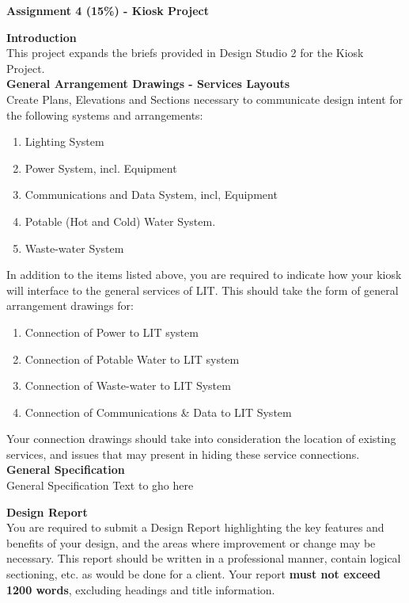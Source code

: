 
	
\begin{flushleft}
\Large\textbf{Assignment 4 (15\%) - Kiosk Project}\\
\end{flushleft}


\textbf{Introduction}\\
This project expands the briefs provided in Design Studio 2 for the Kiosk Project.\\

\textbf{General Arrangement Drawings - Services Layouts }\\
Create Plans, Elevations and Sections necessary to communicate design intent for the following systems and arrangements:

\begin{enumerate}
	\item Lighting System
	\item Power System, incl. Equipment
	\item Communications and Data System, incl, Equipment
	\item Potable (Hot and Cold) Water System.
	\item Waste-water System
\end{enumerate}

In addition to the items listed above, you are required to indicate how your kiosk will interface to the general services of LIT.  This should take the form of general arrangement drawings for:
\begin{enumerate}
	\item Connection of Power to LIT system
	\item Connection of Potable Water to LIT system
	\item Connection of Waste-water to LIT System
	\item Connection of Communications \& Data to LIT System
\end{enumerate}

Your connection drawings should take into consideration the location of existing services, and issues that may present in hiding these service connections.\\

\textbf{General Specification}\\

General Specification Text to gho here

\textbf{Design Report}\\
You are required to submit a Design Report highlighting the key features and benefits of your design, and the areas where improvement or change may be necessary.  This report should be written in a professional manner, contain logical sectioning, etc. as would be done for a client.  Your report \textbf{must not exceed 1200 words}, excluding headings and title information.\\

